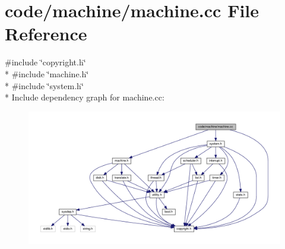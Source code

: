 \section{code/machine/machine.cc File Reference}
\label{machine_8cc}
{\ttfamily \#include \char`\"{}copyright.\+h\char`\"{}}\\*
{\ttfamily \#include \char`\"{}machine.\+h\char`\"{}}\\*
{\ttfamily \#include \char`\"{}system.\+h\char`\"{}}\\*
Include dependency graph for machine.\+cc\+:
\nopagebreak
\begin{figure}[H]
\begin{center}
\leavevmode
\includegraphics[width=350pt]{machine_8cc__incl}
\end{center}
\end{figure}
